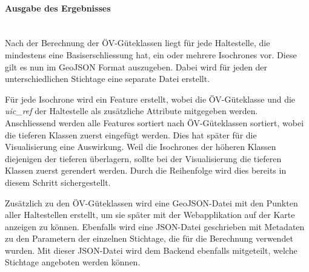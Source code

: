 \paragraph{Ausgabe des Ergebnisses}~\\
Nach der Berechnung der \acs{ÖV}-Güteklassen liegt für jede Haltestelle, die mindestens eine Basiserschliessung hat, ein oder mehrere \glspl{Isochrone} vor.
Diese gilt es nun im GeoJSON Format auszugeben.
Dabei wird für jeden der unterschiedlichen Stichtage eine separate Datei erstellt.

Für jede \gls{Isochrone} wird ein Feature erstellt, wobei die \acs{ÖV}-Güteklasse und die \emph{uic\_ref} der Haltestelle als zusätzliche Attribute mitgegeben werden.
Anschliessend werden alle Features sortiert nach \acs{ÖV}-Güteklassen sortiert, wobei die tieferen Klassen zuerst eingefügt werden.
Dies hat später für die Visualisierung eine Auswirkung.
Weil die \glspl{Isochrone} der höheren Klassen diejenigen der tieferen überlagern, sollte bei der Visualisierung die tieferen Klassen zuerst gerendert werden.
Durch die Reihenfolge wird dies bereits in diesem Schritt sichergestellt.

Zusätzlich zu den \acs{ÖV}-Güteklassen wird eine GeoJSON-Datei mit den Punkten aller Haltestellen erstellt, um sie später mit der Webapplikation auf der Karte anzeigen zu können.
Ebenfalls wird eine JSON-Datei geschrieben mit Metadaten zu den Parametern der einzelnen Stichtage, die für die Berechnung verwendet wurden.
Mit dieser JSON-Datei wird dem Backend ebenfalls mitgeteilt, welche Stichtage angeboten werden können.
